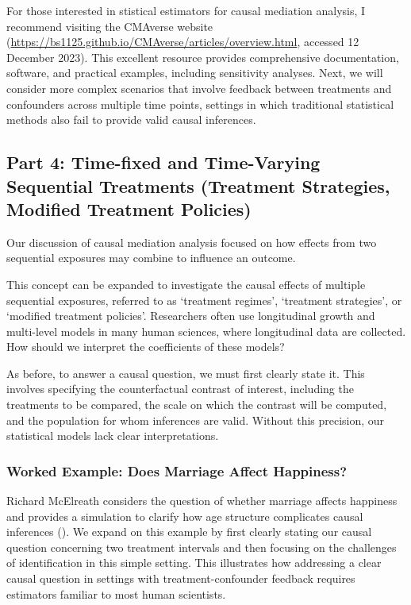 \documentclass[
  single column]{article}
\begin{document}
For those interested in stistical estimators for causal mediation
analysis, I recommend visiting the CMAverse website
(\url{https://bs1125.github.io/CMAverse/articles/overview.html},
accessed 12 December 2023). This excellent resource provides
comprehensive documentation, software, and practical examples, including
sensitivity analyses. Next, we will consider more complex scenarios that
involve feedback between treatments and confounders across multiple time
points, settings in which traditional statistical methods also fail to
provide valid causal inferences.

\subsection{Part 4: Time-fixed and Time-Varying Sequential Treatments
(Treatment Strategies, Modified Treatment Policies)}\label{id-sec-4}

Our discussion of causal mediation analysis focused on how effects from
two sequential exposures may combine to influence an outcome.

This concept can be expanded to investigate the causal effects of
multiple sequential exposures, referred to as `treatment regimes',
`treatment strategies', or `modified treatment policies'. Researchers
often use longitudinal growth and multi-level models in many human
sciences, where longitudinal data are collected. How should we interpret
the coefficients of these models?

As before, to answer a causal question, we must first clearly state it.
This involves specifying the counterfactual contrast of interest,
including the treatments to be compared, the scale on which the contrast
will be computed, and the population for whom inferences are valid.
Without this precision, our statistical models lack clear
interpretations.

\subsubsection{Worked Example: Does Marriage Affect
Happiness?}\label{worked-example-does-marriage-affect-happiness}

Richard McElreath considers the question of whether marriage affects
happiness and provides a simulation to clarify how age structure
complicates causal inferences (). We expand on this example by first clearly stating
our causal question concerning two treatment intervals and then focusing
on the challenges of identification in this simple setting. This
illustrates how addressing a clear causal question in settings with
treatment-confounder feedback requires estimators familiar to most human
scientists.
\end{document}
